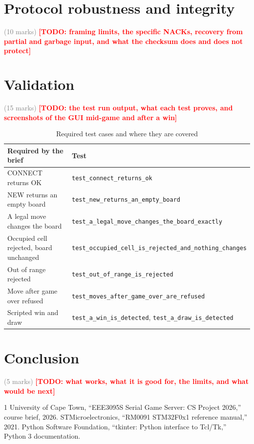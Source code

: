 \documentclass[conference]{IEEEtran}
\newcommand{\todo}[1]{\textcolor{red}{\textbf{[TODO: #1]}}}
\newcommand{\weight}[1]{\textcolor{gray}{\small(#1 marks)}}
\begin{document}
\section{Protocol robustness and integrity} \weight{10}
\todo{framing limits, the specific NACKs, recovery from partial and garbage
input, and what the checksum does and does not protect}

\section{Validation} \weight{15}
\todo{the test run output, what each test proves, and screenshots of the GUI
mid-game and after a win}

\begin{table}[htbp]
\caption{Required test cases and where they are covered}
\label{tab:tests}
\centering
\begin{tabular}{p{4.6cm}p{2.6cm}}
\hline
\textbf{Required by the brief} & \textbf{Test} \\
\hline
CONNECT returns OK & \texttt{test\_connect\_returns\_ok} \\
NEW returns an empty board & \texttt{test\_new\_returns\_an\_empty\_board} \\
A legal move changes the board & \texttt{test\_a\_legal\_move\_changes\_the\_board\_exactly} \\
Occupied cell rejected, board unchanged & \texttt{test\_occupied\_cell\_is\_rejected\_and\_nothing\_changes} \\
Out of range rejected & \texttt{test\_out\_of\_range\_is\_rejected} \\
Move after game over refused & \texttt{test\_moves\_after\_game\_over\_are\_refused} \\
Scripted win and draw & \texttt{test\_a\_win\_is\_detected}, \texttt{test\_a\_draw\_is\_detected} \\
\hline
\end{tabular}
\end{table}

\section{Conclusion} \weight{5}
\todo{what works, what it is good for, the limits, and what would be next}

\begin{thebibliography}{1}
 University of Cape Town, ``EEE3095S Serial Game Server: CS Project 2026,'' course brief, 2026.
 STMicroelectronics, ``RM0091 STM32F0x1 reference manual,'' 2021.
 Python Software Foundation, ``tkinter: Python interface to Tcl/Tk,'' Python 3 documentation.
\end{thebibliography}
\end{document}
